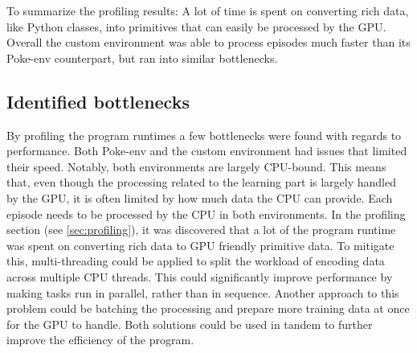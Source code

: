 To summarize the profiling results: A lot of time is spent on converting rich data, like Python classes, into primitives that can easily be processed
by the GPU. Overall the custom environment was able to process episodes much faster than its Poke-env counterpart, but ran into similar bottlenecks.

\subsection{Identified bottlenecks}
\label{sec:bottlenecks}
By profiling the program runtimes a few bottlenecks were found with regards to performance.
Both Poke-env and the custom environment had issues that limited their speed. Notably, both environments are
largely CPU-bound. This means that, even though the processing related to the learning part is largely handled by the GPU, it is often
limited by how much data the CPU can provide. Each episode needs to be processed by the CPU in both environments. In the profiling section (see \ref{sec:profiling}), 
it was discovered that a lot of the program runtime was spent on converting rich data to GPU friendly primitive data. To mitigate this, multi-threading could
be applied to split the workload of encoding data across multiple CPU threads. This could significantly improve performance by making tasks run in parallel, rather than
in sequence. Another approach to this problem could be batching the processing and prepare more training data at once for the GPU to handle.
Both solutions could be used in tandem to further improve the efficiency of the program.

